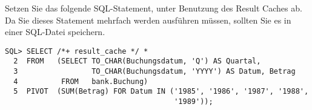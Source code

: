     \item Setzen Sie das folgende SQL-Statement, unter Benutzung des Result
    Caches ab. Da Sie dieses Statement mehrfach werden ausführen müssen,
    sollten Sie es in einer SQL-Datei speichern.
    \begin{lstlisting}[language=oracle_sql,alsolanguage=sqlplus]
SQL> SELECT /*+ result_cache */ *
  2  FROM   (SELECT TO_CHAR(Buchungsdatum, 'Q') AS Quartal,
  3                 TO_CHAR(Buchungsdatum, 'YYYY') AS Datum, Betrag
  4          FROM   bank.Buchung)
  5  PIVOT  (SUM(Betrag) FOR Datum IN ('1985', '1986', '1987', '1988', 
                                       '1989'));
    \end{lstlisting}
